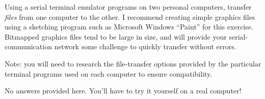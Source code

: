 

Using a serial terminal emulator programs on two personal computers, transfer {\it files} from one computer to the other.  I recommend creating simple graphics files using a sketching program such as Microsoft Windows ``Paint'' for this exercise.  Bitmapped graphics files tend to be large in size, and will provide your serial-communication network some challenge to quickly transfer without errors.  

\vskip 10pt

Note: you will need to research the file-transfer options provided by the particular terminal programs used on each computer to ensure compatibility.







No answers provided here.  You'll have to try it yourself on a real computer!











